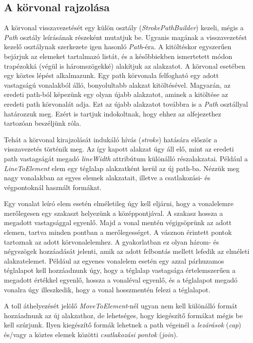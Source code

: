 \documentclass[12pt]{report}
\theoremstyle{definition}
\newcommand{\inenglish}[1]{\textsl{#1}}
\newcommand{\func}[1]{{\textsl{#1}}}
\begin{document}
    \subsection[A körvonal rajzolása]{A körvonal rajzolása}

A körvonal visszavezetését egy külön osztály (\func{StrokePathBuilder}) kezeli,
mégis a \func{Path} osztály leírásának részeként mutatjuk be. Ugyanis magának a
visszavezetést kezelő osztálynak szerkezete igen hasonló \func{Path}-éra. A
kitöltéskor egyszerűen bejárjuk az elemeket tartalmazó listát, és a
későbbiekben ismertetett módon trapézokká (végül is háromszögekké) alakítjuk az
alakzatot. A körvonal esetében egy köztes lépést alkalmazunk. Egy path
körvonala felfogható egy adott vastagságú vonalakból álló, bonyolultabb alakzat
kitöltésével. Magyarán, az eredeti path-ból képezünk egy olyan újabb
alakzatot, aminek a kitöltése az eredeti path körvonalát adja. Ezt az újabb
alakzatot továbbra is a \func{Path} osztállyal határozzuk meg. Ezért is tartjuk
indokoltnak, hogy ehhez az alfejezethez tartozóan beszéljünk róla.

Tehát a körvonal kirajzolását indukáló hívás (\emph{stroke}) hatására először a
visszavezetés történik meg. Az így kapott alakzat úgy áll elő, mint az eredeti
path vastagságát megadó \func{lineWidth} attribútum különálló részalakzatai.
Például a \func{LineToElement} elem egy téglalap alakzatként kerül az új
path-ba. Nézzük meg nagy vonalakban az egyes elemek alakzatait, illetve a
csatlakozási- és végpontoknál használt formákat.

Egy vonalat leíró elem esetén elméletileg úgy kell eljárni, hogy a vonalelemre
merőlegesen egy szakaszt helyezünk a középpontjával. A szakasz hossza a
megadott vastagsággal egyenlő. Majd a vonal mentén végigsöprünk az adott
elemen, tartva minden pontban a merőlegességet. A vásznon érintett pontok
tartoznak az adott körvonalelemhez. A gyakorlatban ez olyan három- és
négyszögek hozzáadását jelenti, amik az adott felbontás mellett lefedik az
elméleti alakzatelemet.  Például az egyenes vonalelem esetén egy azzal
párhuzamos téglalapot kell hozzáadnunk úgy, hogy a téglalap vastagsága
értelemszerűen a megadott értékkel egyenlő, hossza a vonaléval egyenlő, és a
téglalapot megadó vonalra úgy illeszkedik, hogy a vonal hosszmentén felezi a
téglalapot.

A toll áthelyezését jelölő \func{MoveToElement}-nél ugyan nem kell különálló
formát hozzáadnunk az új alakzathoz, de lehetséges, hogy kiegészítő formákat
mégis be kell szúrjunk. Ilyen kiegészítő formák lehetnek a path végeinél a
\emph{lezárások} (\inenglish{cap}) és/vagy a köztes elemek közötti
\emph{csatlakozási pontok} (\inenglish{join}).
\end{document}
